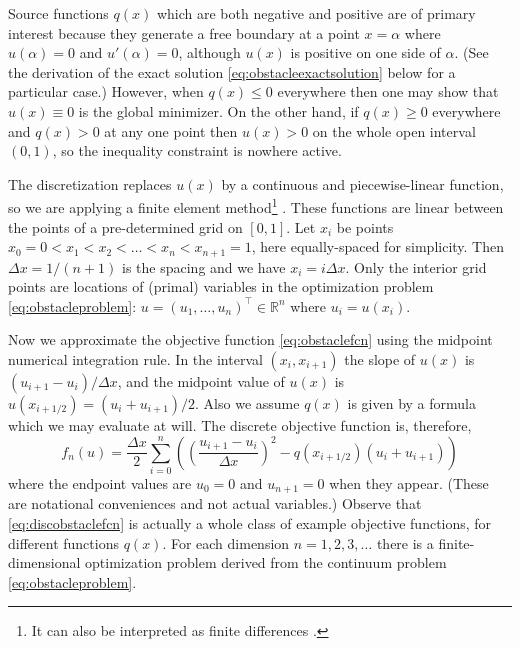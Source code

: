\documentclass[11pt]{article}
\newcommand{\RR}{\mathbb{R}}
\begin{document}
Source functions $q(x)$ which are both negative and positive are of primary interest because they generate a free boundary at a point $x=\alpha$ where $u(\alpha)=0$ and $u'(\alpha)=0$, although $u(x)$ is positive on one side of $\alpha$.  (See the derivation of the exact solution \eqref{eq:obstacleexactsolution} below for a particular case.)  However, when $q(x)\le 0$ everywhere then one may show that $u(x)\equiv 0$ is the global minimizer.  On the other hand, if $q(x)\ge 0$ everywhere and $q(x) > 0$ at any one point then $u(x)>0$ on the whole open interval $(0,1)$, so the inequality constraint is nowhere active.

The discretization replaces $u(x)$ by a continuous and piecewise-linear function, so we are applying a finite element method\footnote{It can also be interpreted as finite differences \cite{LeVeque2007}.} \cite{Elmanetal2014}.  These functions are linear between the points of a pre-determined grid on $[0,1]$.  Let $x_i$ be points $x_0 = 0 < x_1 < x_2 < \dots < x_n < x_{n+1}=1$, here equally-spaced for simplicity.  Then $\Delta x = 1 / (n+1)$ is the spacing and we have $x_i = i\Delta x$.  Only the interior grid points are locations of (primal) variables in the optimization problem \eqref{eq:obstacleproblem}: $u = (u_1,\dots,u_n)^\top \in \RR^n$ where $u_i=u(x_i)$.

Now we approximate the objective function \eqref{eq:obstaclefcn} using the midpoint numerical integration rule.  In the interval $(x_i,x_{i+1})$ the slope of $u(x)$ is $(u_{i+1}-u_i)/\Delta x$, and the midpoint value of $u(x)$ is $u(x_{i+1/2}) = (u_i + u_{i+1})/2$.  Also we assume $q(x)$ is given by a formula which we may evaluate at will.  The discrete objective function is, therefore,
\begin{equation}
    f_n(u) = \frac{\Delta x}{2} \sum_{i=0}^n \left(\left(\frac{u_{i+1}-u_i}{\Delta x}\right)^2 - q(x_{i+1/2}) (u_i + u_{i+1})\right) \label{eq:discobstaclefcn}
\end{equation}
where the endpoint values are $u_0=0$ and $u_{n+1}=0$ when they appear.  (These are notational conveniences and not actual variables.)  Observe that \eqref{eq:discobstaclefcn} is actually a whole class of example objective functions, for different functions $q(x)$.  For each dimension $n=1,2,3,\dots$ there is a finite-dimensional optimization problem derived from the continuum problem \eqref{eq:obstacleproblem}.
\end{document}
